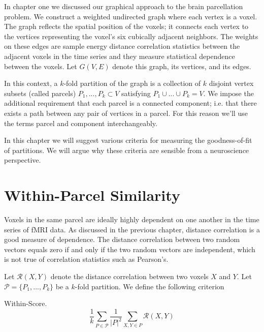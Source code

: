 
In chapter one we discussed our graphical approach to the brain
parcellation problem. We construct a weighted undirected graph where
each vertex is a voxel. The graph reflects the spatial position of the
voxels; it connects each vertex to the vertices representing the voxel's
six cubically adjacent neighbors. The weights on these edges are sample
energy distance correlation statistics between the adjacent voxels in
the time series and they measure statistical dependence between the
voxels. Let $G(V, E)$ denote this graph, its vertices, and its edges.

In this context, a $k$-fold partition of the graph is a collection of
$k$ disjoint vertex subsets (called parcels) $P_1, ..., P_k \subset V$
satisfying $P_1 \cup ... \cup P_k = V$. We impose the additional
requirement that each parcel is a connected component; i.e. that there
exists a path between any pair of vertices in a parcel. For this reason
we'll use the terms parcel and component interchangeably.

In this chapter we will suggest various criteria for measuring the
goodness-of-fit of partitions. We will argue why these criteria are
sensible from a neuroscience perspective.

\section{Within-Parcel Similarity}

Voxels in the same parcel are ideally highly dependent on one another in
the time series of fMRI data. As discussed in the previous chapter,
distance correlation is a good measure of dependence. The distance
correlation between two random vectors equals zero if and only if the
two random vectors are independent, which is not true of correlation
statistics such as Pearson's.

Let $\mathcal{R}(X,Y)$ denote the distance correlation between two
voxels $X$ and $Y$. Let $\mathcal{P} = \{P_1, ..., P_k\}$ be a $k$-fold partition. We define the following criterion

\begin{definition} \label{within-score}
Within-Score.
\[ \frac{1}{k} \sum_{P \in \mathcal{P}}
   \frac{1}{|P|^2} \sum_{X,Y \in P} \mathcal{R}(X,Y)
\]
\end{definition}

